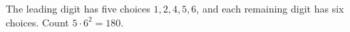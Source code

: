 The leading digit has five choices $1,2,4,5,6$, and each remaining digit has six choices. Count $5\cdot6^2=\boxed{180}$.
